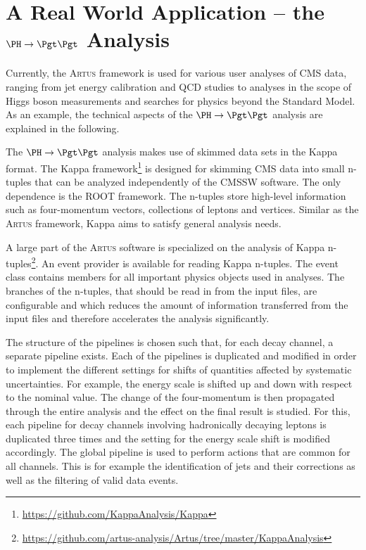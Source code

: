 \documentclass[3p]{elsarticle}
\newcommand{\software}[1]{\textsc{#1}\xspace}
\newcommand{\artus}{\software{Artus}}
\begin{document}
\section{\texorpdfstring{A Real World Application -- the $\PH\to\Pgt\Pgt$ Analysis}{A Real World Application - the H to Tau Tau Analysis}}
\label{section_artus_example_htt}

Currently, the \artus framework is used for various user analyses of CMS data, ranging from jet energy calibration and QCD studies to analyses in the scope of Higgs boson measurements and searches for physics beyond the Standard Model.
As an example, the technical aspects of the $\PH\to\Pgt\Pgt$ analysis are explained in the following.

The $\PH\to\Pgt\Pgt$ analysis makes use of skimmed data sets in the Kappa format.
The Kappa framework\footnote{\url{https://github.com/KappaAnalysis/Kappa}} is designed for skimming CMS data into small n-tuples that can be analyzed independently of the CMSSW software.
The only dependence is the ROOT framework.
The n-tuples store high-level information such as four-momentum vectors, collections of leptons and vertices.
Similar as the \artus framework, Kappa aims to satisfy general analysis needs.

A large part of the \artus software is specialized on the analysis of Kappa n-tuples\footnote{\url{https://github.com/artus-analysis/Artus/tree/master/KappaAnalysis}}.
An event provider is available for reading Kappa n-tuples.
The event class contains members for all important physics objects used in analyses.
The branches of the n-tuples, that should be read in from the input files, are configurable and which reduces the amount of information transferred from the input files and therefore accelerates the analysis significantly.

The structure of the pipelines is chosen such that, for each decay channel, a separate pipeline exists.
Each of the pipelines is duplicated and modified in order to implement the different settings for shifts of quantities affected by systematic uncertainties.
For example, the \Pgt energy scale is shifted up and down with respect to the nominal value.
The change of the \Pgt four-momentum is then propagated through the entire analysis and the effect on the final result is studied.
For this, each pipeline for decay channels involving hadronically decaying \Pgt leptons is duplicated three times and the setting for the \Pgt energy scale shift is modified accordingly.
The global pipeline is used to perform actions that are common for all channels.
This is for example the identification of jets and their corrections as well as the filtering of valid data events.
\end{document}
